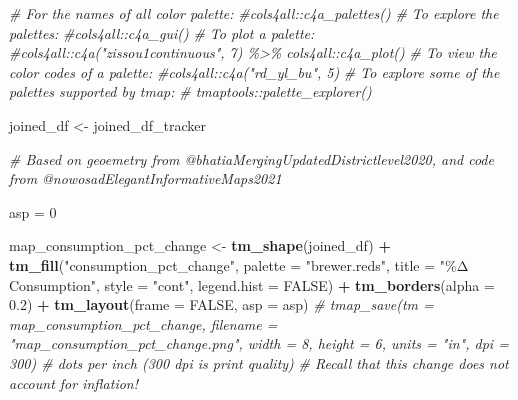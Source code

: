 \documentclass[
]{article}
\newenvironment{Shaded}{\begin{snugshade}}{\end{snugshade}}
\newcommand{\AttributeTok}[1]{\textcolor[rgb]{0.13,0.29,0.53}{#1}}
\newcommand{\CommentTok}[1]{\textcolor[rgb]{0.56,0.35,0.01}{\textit{#1}}}
\newcommand{\ConstantTok}[1]{\textcolor[rgb]{0.56,0.35,0.01}{#1}}
\newcommand{\DecValTok}[1]{\textcolor[rgb]{0.00,0.00,0.81}{#1}}
\newcommand{\FloatTok}[1]{\textcolor[rgb]{0.00,0.00,0.81}{#1}}
\newcommand{\FunctionTok}[1]{\textcolor[rgb]{0.13,0.29,0.53}{\textbf{#1}}}
\newcommand{\NormalTok}[1]{#1}
\newcommand{\OtherTok}[1]{\textcolor[rgb]{0.56,0.35,0.01}{#1}}
\newcommand{\SpecialCharTok}[1]{\textcolor[rgb]{0.81,0.36,0.00}{\textbf{#1}}}
\newcommand{\StringTok}[1]{\textcolor[rgb]{0.31,0.60,0.02}{#1}}
\begin{document}
\begin{Shaded}
\begin{Highlighting}[]
\CommentTok{\# For the names of all color palette:}
\CommentTok{\#cols4all::c4a\_palettes()}
\CommentTok{\# To explore the palettes:}
\CommentTok{\#cols4all::c4a\_gui()}
\CommentTok{\# To plot a palette:}
\CommentTok{\#cols4all::c4a("zissou1continuous", 7) \%\textgreater{}\% cols4all::c4a\_plot()}
\CommentTok{\# To view the color codes of a palette:}
\CommentTok{\#cols4all::c4a("rd\_yl\_bu", 5)}
\CommentTok{\# To explore some of the palettes supported by tmap:}
\CommentTok{\# tmaptools::palette\_explorer()}

\NormalTok{joined\_df }\OtherTok{\textless{}{-}}\NormalTok{ joined\_df\_tracker}


\CommentTok{\# Based on geoemetry from @bhatiaMergingUpdatedDistrictlevel2020, and code from @nowosadElegantInformativeMaps2021}

\NormalTok{asp }\OtherTok{=} \DecValTok{0}

\NormalTok{map\_consumption\_pct\_change }\OtherTok{\textless{}{-}} \FunctionTok{tm\_shape}\NormalTok{(joined\_df) }\SpecialCharTok{+}
  \FunctionTok{tm\_fill}\NormalTok{(}\StringTok{"consumption\_pct\_change"}\NormalTok{, }\AttributeTok{palette =} \StringTok{"brewer.reds"}\NormalTok{, }\AttributeTok{title =} \StringTok{"\%Δ Consumption"}\NormalTok{, }\AttributeTok{style =} \StringTok{"cont"}\NormalTok{, }\AttributeTok{legend.hist =} \ConstantTok{FALSE}\NormalTok{) }\SpecialCharTok{+} 
  \FunctionTok{tm\_borders}\NormalTok{(}\AttributeTok{alpha =} \FloatTok{0.2}\NormalTok{) }\SpecialCharTok{+}
  \FunctionTok{tm\_layout}\NormalTok{(}\AttributeTok{frame =} \ConstantTok{FALSE}\NormalTok{, }\AttributeTok{asp =}\NormalTok{ asp)}
\CommentTok{\# tmap\_save(tm = map\_consumption\_pct\_change, filename = "map\_consumption\_pct\_change.png", width = 8, height = 6, units = "in", dpi = 300) \# dots per inch (300 dpi is print quality)}
\CommentTok{\# Recall that this change does not account for inflation!}


\end{Highlighting}
\end{Shaded}
\end{document}
